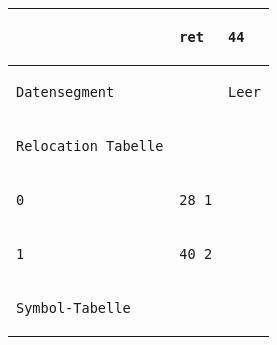 \documentclass{ti2}
\begin{document}
\begin{tabular}{ | l | l | l|}
&
\begin{lstlisting}
ret
\end{lstlisting} &
\begin{lstlisting}
44
\end{lstlisting} \\ \hline \hline

\begin{lstlisting}
Datensegment
\end{lstlisting} &
\begin{lstlisting}
\end{lstlisting} &
\begin{lstlisting}
Leer
\end{lstlisting} \\ \hline \hline

\begin{lstlisting}
Relocation Tabelle
\end{lstlisting} &
\begin{lstlisting}
\end{lstlisting} &
\begin{lstlisting}

\end{lstlisting} \\ \hline 

\begin{lstlisting}
0
\end{lstlisting} &
\begin{lstlisting}
28 1
\end{lstlisting} &
\begin{lstlisting}
\end{lstlisting} \\ \hline 

\begin{lstlisting}
1
\end{lstlisting} &
\begin{lstlisting}
40 2
\end{lstlisting} &
\begin{lstlisting}
\end{lstlisting} \\ \hline \hline

\begin{lstlisting}
Symbol-Tabelle
\end{lstlisting} &
\begin{lstlisting}
\end{lstlisting} &
\begin{lstlisting}
\end{lstlisting} \\ \hline


\end{tabular}
\end{document}
